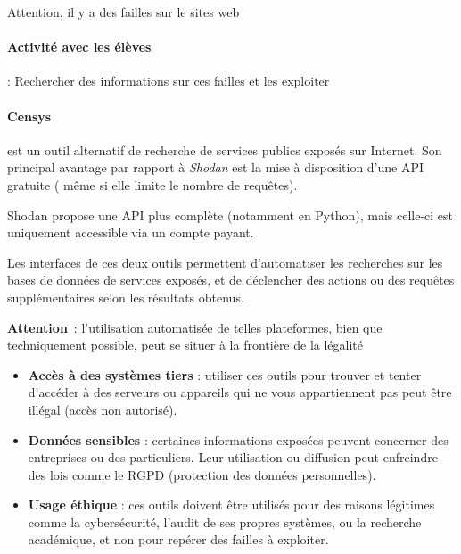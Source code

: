 \documentclass[french, 12pt]{article}%
\newcommand{\itemE}{\item[$\bullet$]}
\begin{document}
Attention, il y a des failles sur le sites web

\paragraph{Activité avec les élèves } : Rechercher des informations sur ces failles et les exploiter


\vspace{0.5cm}

\paragraph{Censys} est un outil alternatif de recherche de services publics exposés sur Internet. Son principal avantage par rapport à \textit{Shodan} est la mise à disposition d'une API gratuite ( même si elle limite le nombre de requêtes). 

Shodan propose une API plus complète (notamment en Python), mais celle-ci est uniquement accessible via un compte payant. 

Les interfaces de ces deux outils permettent d'automatiser les recherches sur les bases de données de services exposés, et de déclencher des actions ou des requêtes supplémentaires selon les résultats obtenus.

\textbf{Attention}~: l'utilisation automatisée de telles plateformes, bien que techniquement possible, peut se situer à la frontière de la légalité 

\begin{itemize}
     
    \itemE \textbf{Accès à des systèmes tiers} : utiliser ces outils pour trouver et tenter d'accéder à des serveurs ou appareils qui ne vous appartiennent pas peut être illégal (accès non autorisé).
    
    \itemE \textbf{Données sensibles} : certaines informations exposées peuvent concerner des entreprises ou des particuliers. Leur utilisation ou diffusion peut enfreindre des lois comme le RGPD (protection des données personnelles).
    
    \itemE \textbf{Usage éthique} : ces outils doivent être utilisés pour des raisons légitimes comme la cybersécurité, l'audit de ses propres systèmes, ou la recherche académique, et non pour repérer des failles à exploiter.
\end{itemize}
\end{document}
